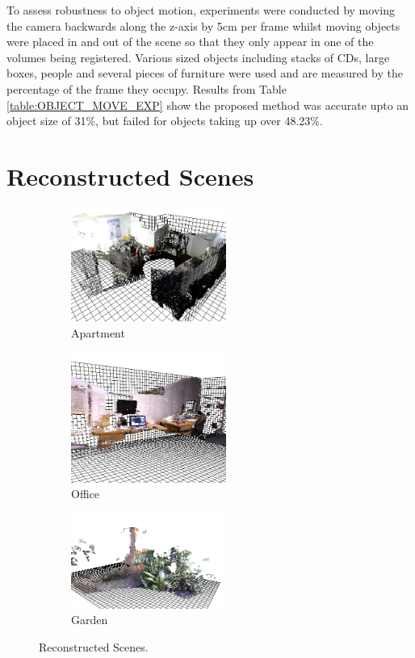 To assess robustness to object motion, experiments were conducted by moving the camera backwards along the z-axis by 5cm per frame whilst moving objects were placed in and out of the scene so that they only appear in one of the volumes being registered. Various sized objects including stacks of CDs, large boxes, people and several pieces of furniture were used and are measured by the percentage of the frame they occupy. Results from Table \ref{table:OBJECT_MOVE_EXP} show the proposed method was accurate upto an object size of 31\%, but failed for objects taking up over 48.23\%.

\section{Reconstructed Scenes}

\begin{figure}[t] 
        \centering
        \begin{subfigure}[b]{2.0in}
                \includegraphics[width=2.0in]{images/ch2/unit21}
                \caption{Apartment}
                \label{fig:RECON_UNIT}
        \end{subfigure}%
        \begin{subfigure}[b]{2.0in}
                \includegraphics[width=2.0in]{images/ch2/officeA}
                \caption{Office}
                \label{fig:RECON_OFFICE}
        \end{subfigure}%
        \begin{subfigure}[b]{2.0in}
                \includegraphics[width=2.0in]{images/ch2/outdoorA}
                \caption{Garden}
                \label{fig:RECON_GARDEN}
        \end{subfigure}
       \caption{Reconstructed Scenes.}
       \label{fig:RECONSTRUCTIONS}
\end{figure}

